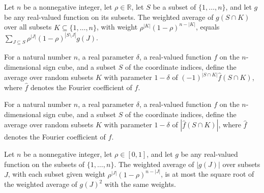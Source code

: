 \begin{theorem}
\label{FABL.expectDeltaRandomSubset_intersection_eq_sum}
\leanok
{}
Let $n$ be a nonnegative integer, let $\rho\in\mathbb R$, let $S$ be a subset of
$\{1,\ldots,n\}$, and let $g$ be any real-valued function on its subsets. The weighted
average of $g(S\cap K)$ over all subsets $K\subseteq\{1,\ldots,n\}$, with weight
$\rho^{|K|}(1-\rho)^{n-|K|}$, equals $\sum_{J\subseteq S}\rho^{|J|}(1-\rho)^{|S\setminus
J|}g(J)$.
\end{theorem}

\begin{definition}
\label{FABL.oxrRandomSubsetFourierAverage}
\leanok
{}
For a natural number $n$, a real parameter $\delta$, a real-valued function $f$ on the
$n$-dimensional sign cube, and a subset $S$ of the coordinate indices, define the
average over random subsets $K$ with parameter $1-\delta$ of $(-1)^{|S\cap K|}\widehat
f(S\cap K)$, where $\widehat f$ denotes the Fourier coefficient of $f$.
\end{definition}

\begin{definition}
\label{FABL.oxrRandomSubsetAbsFourierAverage}
\leanok
{}
For a natural number $n$, a real parameter $\delta$, a real-valued function $f$ on the
$n$-dimensional sign cube, and a subset $S$ of the coordinate indices, define the
average over random subsets $K$ with parameter $1-\delta$ of $|\widehat f(S\cap K)|$,
where $\widehat f$ denotes the Fourier coefficient of $f$.
\end{definition}

\begin{theorem}
\label{FABL.expectDeltaRandomSubset_abs_le_sqrt_sq}
\leanok
{}
Let $n$ be a nonnegative integer, let $\rho\in[0,1]$, and let $g$ be any real-valued
function on the subsets of $\{1,\ldots,n\}$. The weighted average of $|g(J)|$ over
subsets $J$, with each subset given weight $\rho^{|J|}(1-\rho)^{n-|J|}$, is at most the
square root of the weighted average of $g(J)^2$ with the same weights.
\end{theorem}

